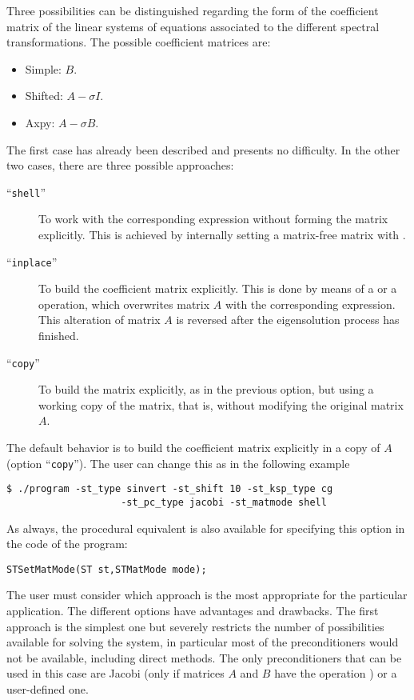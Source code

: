 	Three possibilities can be distinguished regarding the form of the coefficient matrix of the linear systems of equations associated to the different spectral transformations. The possible coefficient matrices are:
	\begin{itemize}
	\item Simple: $B$.
	\item Shifted: $A-\sigma I$.
	\item Axpy: $A-\sigma B$.
	\end{itemize}
	The first case has already been described and presents no difficulty. In the other two cases, there are three possible approaches:
	\begin{description}
	\item[``\Verb!shell!''] To work with the corresponding expression without forming the matrix explicitly. This is achieved by internally setting a matrix-free matrix with .
	\item[``\Verb!inplace!''] To build the coefficient matrix explicitly. This is done by means of a  or a  operation, which overwrites matrix $A$ with the corresponding expression. This alteration of matrix $A$ is reversed after the eigensolution process has finished.
	\item[``\Verb!copy!''] To build the matrix explicitly, as in the previous option, but using a working copy of the matrix, that is, without modifying the original matrix $A$. 
	\end{description}
	The default behavior is to build the coefficient matrix explicitly in a copy of $A$ (option ``\Verb!copy!''). The user can change this as in the following example
\begin{Verbatim}[fontsize=\small]
	$ ./program -st_type sinvert -st_shift 10 -st_ksp_type cg
                    -st_pc_type jacobi -st_matmode shell
\end{Verbatim}
	As always, the procedural equivalent is also available for specifying this option in the code of the program:
	\begin{Verbatim}[fontsize=\small]
	STSetMatMode(ST st,STMatMode mode);
	\end{Verbatim}

	The user must consider which approach is the most appropriate for the particular application. The different options have advantages and drawbacks. The first approach is the simplest one but severely restricts the number of possibilities available for solving the system, in particular most of the \petsc{} preconditioners would not be available, including direct methods. The only preconditioners that can be used in this case are Jacobi (only if matrices $A$ and $B$ have the operation ) or a user-defined one.
	
